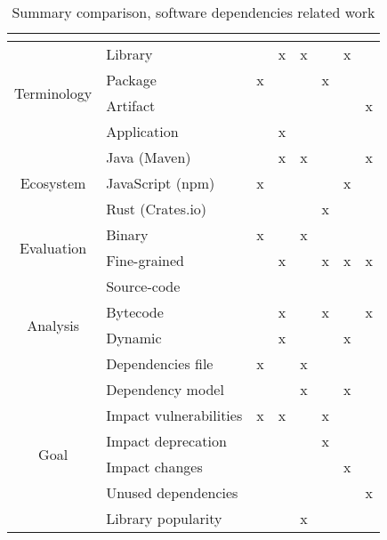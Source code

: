 \begin{table}[ht!]
\begin{center}
  \begin{tabular}{|c|l|c|c|c|c|c|c|}
  \hline
   &  & \cite{hejderup2015dependencies} & \cite{plate2015impact} & \cite{Kula2017} & \cite{hejderup2018prazi} & \cite{hejderup2018software} & \cite{soto2020comprehensive} \\ \hline\hline
  \multirow{4}{*}{Terminology} & Library &  & x & x &  & x &  \\ \cline{2-8}
   & Package & x &  &  & x &  &  \\ \cline{2-8}
   & Artifact &  &  &  &  &  & x \\ \cline{2-8}
   & Application &  & x &  &  &  &  \\ \hline\hline
  \multirow{3}{*}{Ecosystem} & Java (Maven) &  & x & x &  &  & x \\ \cline{2-8}
   & JavaScript (npm) & x &  &  &  & x &  \\ \cline{2-8}
   & Rust (Crates.io) &  &  &  & x &  &  \\ \hline\hline
  \multirow{2}{*}{Evaluation} & Binary & x &  & x &  &  &  \\ \cline{2-8}
   & Fine-grained &  & x &  & x & x & x \\ \hline\hline
  \multirow{4}{*}{Analysis} & Source-code &  &  &  &  &  &  \\ \cline{2-8}
   & Bytecode &  & x &  & x &  & x \\ \cline{2-8}
   & Dynamic &  & x &  &  & x &  \\ \cline{2-8}
   & Dependencies file & x &  & x &  &  &  \\ \hline\hline
  \multirow{6}{*}{Goal} & Dependency model &  &  & x &  & x &  \\ \cline{2-8}
   & Impact vulnerabilities & x & x &  & x &  &  \\ \cline{2-8}
   & Impact deprecation &  &  &  & x &  &  \\ \cline{2-8}
   & Impact changes &  &  &  &  & x &  \\ \cline{2-8}
   & Unused dependencies &  &  &  &  &  & x \\ \cline{2-8}
   & Library popularity &  &  & x &  &  &  \\ \hline
  \end{tabular}
\end{center}
\caption{Summary comparison, software dependencies related work}
\label{table:summary-software-dependencies}
\end{table}

